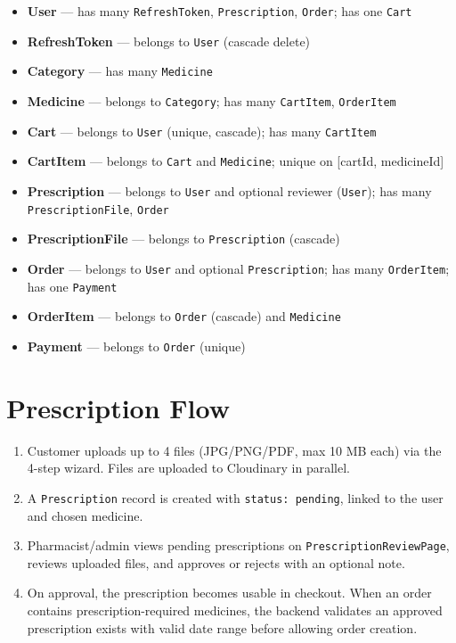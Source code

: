 \documentclass[12pt,a4paper]{article}
\begin{document}
\begin{itemize}[leftmargin=*,nosep]
    \item \textbf{User} --- has many \texttt{RefreshToken}, \texttt{Prescription}, \texttt{Order}; has one \texttt{Cart}
    \item \textbf{RefreshToken} --- belongs to \texttt{User} (cascade delete)
    \item \textbf{Category} --- has many \texttt{Medicine}
    \item \textbf{Medicine} --- belongs to \texttt{Category}; has many \texttt{CartItem}, \texttt{OrderItem}
    \item \textbf{Cart} --- belongs to \texttt{User} (unique, cascade); has many \texttt{CartItem}
    \item \textbf{CartItem} --- belongs to \texttt{Cart} and \texttt{Medicine}; unique on [cartId, medicineId]
    \item \textbf{Prescription} --- belongs to \texttt{User} and optional reviewer (\texttt{User}); has many \texttt{PrescriptionFile}, \texttt{Order}
    \item \textbf{PrescriptionFile} --- belongs to \texttt{Prescription} (cascade)
    \item \textbf{Order} --- belongs to \texttt{User} and optional \texttt{Prescription}; has many \texttt{OrderItem}; has one \texttt{Payment}
    \item \textbf{OrderItem} --- belongs to \texttt{Order} (cascade) and \texttt{Medicine}
    \item \textbf{Payment} --- belongs to \texttt{Order} (unique)
\end{itemize}

\section{Prescription Flow}
\begin{enumerate}
    \item Customer uploads up to 4 files (JPG/PNG/PDF, max 10 MB each) via the 4-step wizard. Files are uploaded to Cloudinary in parallel.
    \item A \texttt{Prescription} record is created with \texttt{status: pending}, linked to the user and chosen medicine.
    \item Pharmacist/admin views pending prescriptions on \texttt{PrescriptionReviewPage}, reviews uploaded files, and approves or rejects with an optional note.
    \item On approval, the prescription becomes usable in checkout. When an order contains prescription-required medicines, the backend validates an approved prescription exists with valid date range before allowing order creation.
\end{enumerate}
\end{document}
